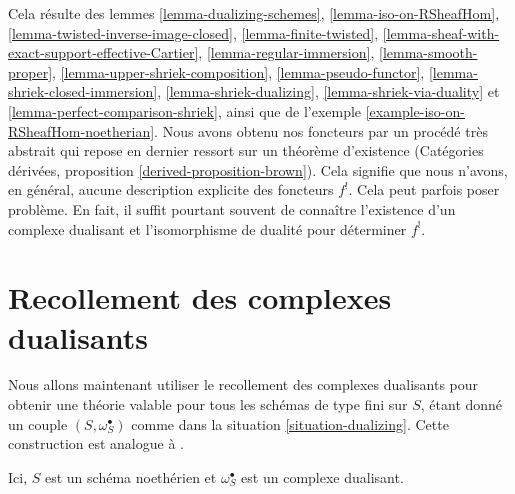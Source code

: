 Cela résulte des lemmes \ref{lemma-dualizing-schemes}, \ref{lemma-iso-on-RSheafHom}, \ref{lemma-twisted-inverse-image-closed}, \ref{lemma-finite-twisted}, \ref{lemma-sheaf-with-exact-support-effective-Cartier}, \ref{lemma-regular-immersion}, \ref{lemma-smooth-proper}, \ref{lemma-upper-shriek-composition}, \ref{lemma-pseudo-functor}, \ref{lemma-shriek-closed-immersion}, \ref{lemma-shriek-dualizing}, \ref{lemma-shriek-via-duality} et \ref{lemma-perfect-comparison-shriek}, ainsi que de l'exemple \ref{example-iso-on-RSheafHom-noetherian}. Nous avons obtenu nos foncteurs par un procédé très abstrait qui repose en dernier ressort sur un théorème d'existence (Catégories dérivées, proposition \ref{derived-proposition-brown}). Cela signifie que nous n'avons, en général, aucune description explicite des foncteurs $f^!$. Cela peut parfois poser problème. En fait, il suffit pourtant souvent de connaître l'existence d'un complexe dualisant et l'isomorphisme de dualité pour déterminer $f^!$.






\section{Recollement des complexes dualisants}
\label{section-glue}

\noindent
Nous allons maintenant utiliser le recollement des complexes dualisants pour obtenir une théorie valable pour tous les schémas de type fini sur $S$, étant donné un couple $(S, \omega_S^\bullet)$ comme dans la situation \ref{situation-dualizing}. Cette construction est analogue à \cite[remarque on page 310]{RD}.

\begin{situation}
\label{situation-dualizing}
Ici, $S$ est un schéma noethérien et $\omega_S^\bullet$ est un complexe dualisant.
\end{situation}

